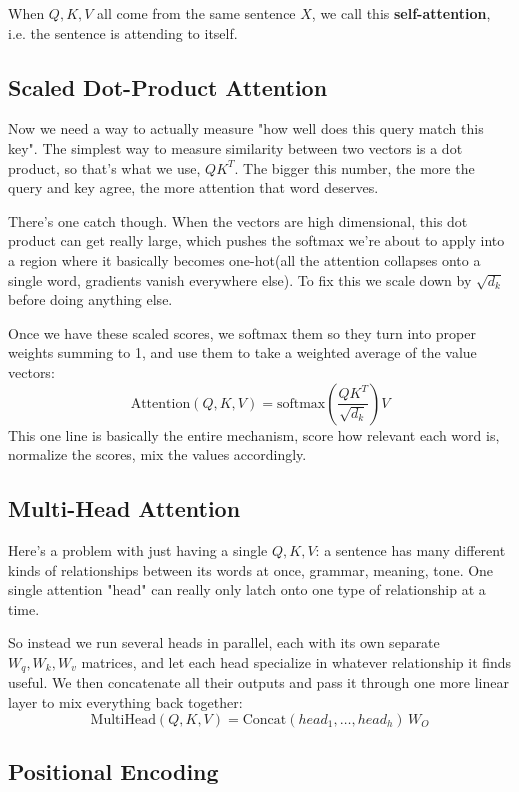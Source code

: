 \documentclass[12pt]{article}
\begin{document}
When $Q,K,V$ all come from the same sentence $X$, we call this \textbf{self-attention}, i.e. the sentence is attending to itself.

\subsection{Scaled Dot-Product Attention}

Now we need a way to actually measure "how well does this query match this key". The simplest way to measure similarity between two vectors is a dot product, so that's what we use, $QK^T$. The bigger this number, the more the query and key agree, the more attention that word deserves.

There's one catch though. When the vectors are high dimensional, this dot product can get really large, which pushes the softmax we're about to apply into a region where it basically becomes one-hot(all the attention collapses onto a single word, gradients vanish everywhere else). To fix this we scale down by $\sqrt{d_k}$ before doing anything else.

Once we have these scaled scores, we softmax them so they turn into proper weights summing to 1, and use them to take a weighted average of the value vectors:
$$\text{Attention}(Q,K,V) = \text{softmax}\left(\frac{QK^T}{\sqrt{d_k}}\right)V$$
This one line is basically the entire mechanism, score how relevant each word is, normalize the scores, mix the values accordingly.

\subsection{Multi-Head Attention}

Here's a problem with just having a single $Q,K,V$: a sentence has many different kinds of relationships between its words at once, grammar, meaning, tone. One single attention "head" can really only latch onto one type of relationship at a time.

So instead we run several heads in parallel, each with its own separate $W_q, W_k, W_v$ matrices, and let each head specialize in whatever relationship it finds useful. We then concatenate all their outputs and pass it through one more linear layer to mix everything back together:
$$\text{MultiHead}(Q,K,V) = \text{Concat}(head_1,\dots,head_h)\,W_O$$

\subsection{Positional Encoding}
\end{document}
